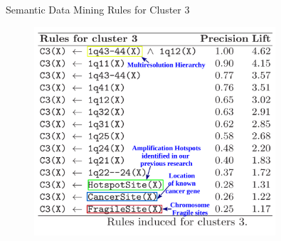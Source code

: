 \documentclass[first=dgreen,second=purple,logo=redexc]{aaltoslides}
\begin{document}
\begin{frame} {Semantic Data Mining Rules for Cluster 3} 

      \begin{figure}
      \centering
      \includegraphics[trim=0cm 0cm 0cm 0cm, clip=true, width=0.8\textwidth]{figures/cluster3}
      \end{figure}
      
%       

\end{frame}

\end{document}

